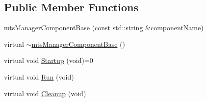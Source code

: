 \subsection*{Public Member Functions}
\begin{DoxyCompactItemize}
\item 
\hyperlink{classmts_manager_component_base_a6f529c7d9680d417f93fbc3ba77c30f8}{mts\+Manager\+Component\+Base} (const std\+::string \&component\+Name)
\item 
virtual \hyperlink{classmts_manager_component_base_a34fa59402e78af5ee0dc1ba97ac347ce}{$\sim$mts\+Manager\+Component\+Base} ()
\item 
virtual void \hyperlink{classmts_manager_component_base_ab5602d8195e8431db97805055032fa1b}{Startup} (void)=0
\item 
virtual void \hyperlink{classmts_manager_component_base_a833777d244564494fbfaed685e2b543d}{Run} (void)
\item 
virtual void \hyperlink{classmts_manager_component_base_ae893671d98413773200cae361eac2071}{Cleanup} (void)
\end{DoxyCompactItemize}
